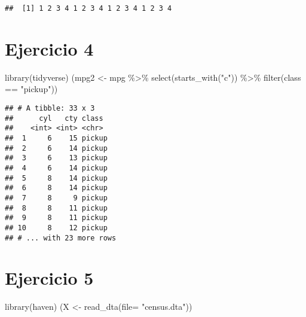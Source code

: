 \documentclass[
]{article}
\newenvironment{Shaded}{\begin{snugshade}}{\end{snugshade}}
\newcommand{\AttributeTok}[1]{\textcolor[rgb]{0.77,0.63,0.00}{#1}}
\newcommand{\FunctionTok}[1]{\textcolor[rgb]{0.00,0.00,0.00}{#1}}
\newcommand{\NormalTok}[1]{#1}
\newcommand{\OtherTok}[1]{\textcolor[rgb]{0.56,0.35,0.01}{#1}}
\newcommand{\SpecialCharTok}[1]{\textcolor[rgb]{0.00,0.00,0.00}{#1}}
\newcommand{\StringTok}[1]{\textcolor[rgb]{0.31,0.60,0.02}{#1}}
\begin{document}
\begin{verbatim}
##  [1] 1 2 3 4 1 2 3 4 1 2 3 4 1 2 3 4
\end{verbatim}

\hypertarget{ejercicio-4}{%
\section{Ejercicio 4}\label{ejercicio-4}}

\begin{Shaded}
\begin{Highlighting}[]
\FunctionTok{library}\NormalTok{(tidyverse)}
\NormalTok{(mpg2 }\OtherTok{\textless{}{-}}\NormalTok{ mpg }\SpecialCharTok{\%\textgreater{}\%} 
  \FunctionTok{select}\NormalTok{(}\FunctionTok{starts\_with}\NormalTok{(}\StringTok{"c"}\NormalTok{)) }\SpecialCharTok{\%\textgreater{}\%} 
  \FunctionTok{filter}\NormalTok{(class }\SpecialCharTok{==} \StringTok{"pickup"}\NormalTok{))}
\end{Highlighting}
\end{Shaded}

\begin{verbatim}
## # A tibble: 33 x 3
##      cyl   cty class 
##    <int> <int> <chr> 
##  1     6    15 pickup
##  2     6    14 pickup
##  3     6    13 pickup
##  4     6    14 pickup
##  5     8    14 pickup
##  6     8    14 pickup
##  7     8     9 pickup
##  8     8    11 pickup
##  9     8    11 pickup
## 10     8    12 pickup
## # ... with 23 more rows
\end{verbatim}

\hypertarget{ejercicio-5}{%
\section{Ejercicio 5}\label{ejercicio-5}}

\begin{Shaded}
\begin{Highlighting}[]
\FunctionTok{library}\NormalTok{(haven)}
\NormalTok{(X }\OtherTok{\textless{}{-}} \FunctionTok{read\_dta}\NormalTok{(}\AttributeTok{file=} \StringTok{"census.dta"}\NormalTok{))}
\end{Highlighting}
\end{Shaded}
\end{document}
